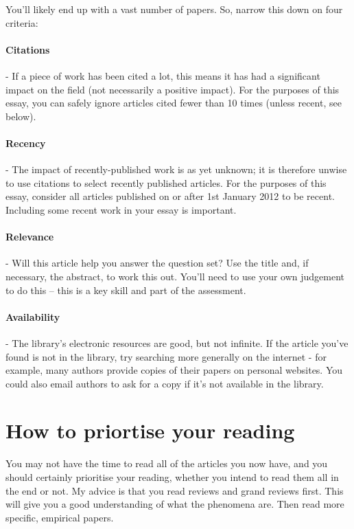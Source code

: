\documentclass[11pt]{article}
\begin{document}
You'll likely end up with a vast number of papers. So, narrow this down on four criteria:

\paragraph{Citations} - If a piece of work has been cited a lot, this means it has had a significant impact on the field (not necessarily a positive impact). For the purposes of this essay, you can safely ignore articles cited fewer than 10 times (unless recent, see below).

\paragraph{Recency} - The impact of recently-published work is as yet unknown; it is therefore unwise to use citations to select recently published articles. For the purposes of this essay, consider all articles published on or after 1st January 2012 to be recent. Including some recent work in your essay is important.

\paragraph{Relevance} - Will this article help you answer the question set? Use the title and, if necessary, the abstract, to work this out. You'll need to use your own judgement to do this -- this is a key skill and part of the assessment.

\paragraph{Availability} - The library's electronic resources are good, but not infinite. If the article you've found is not in the library, try searching more generally on the internet - for example, many authors provide copies of their papers on personal websites. You could also email authors to ask for a copy if it's not available in the library.

\section{How to priortise your reading}

You may not have the time to read all of the articles you now have, and you should certainly prioritise your reading, whether you intend to read them all in the end or not. My advice is that you read reviews and grand reviews first. This will give you a good understanding of what the phenomena are. Then read more specific, empirical papers. 
\end{document}
